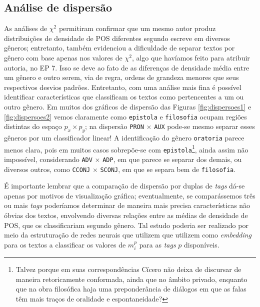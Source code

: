 \documentclass[10pt,a4paper,onecolumn]{article}
\theoremstyle{definition}
\theoremstyle{remark}
\begin{document}
\subsection{Análise de dispersão}\label{sec:dispersao}
As análises de $\chi^2$ permitiram confirmar que um mesmo autor produz distribuições de densidade de POS diferentes segundo escreve em diversos gêneros; entretanto, também evidenciou a dificuldade de separar textos por gênero com base apenas nos valores de $\chi^2$, algo que havíamos feito para atribuir autoria, no EP 7. Isso se deve ao fato de as diferenças de densidade média entre um gênero e outro serem, via de regra, ordens de grandeza menores que seus respectivos desvios padrões. Entretanto, com uma análise mais fina é possível identificar características que classificam os textos como pertencentes a um ou outro gênero. Em muitos dos gráficos de dispersão das Figuras \ref{fig:dispersoes1} e \ref{fig:dispersoes2} vemos claramente como \texttt{epistola} e \texttt{filosofia} ocupam regiões distintas do espaço $p_x \times p_y$; na dispersão \texttt{PRON} $\times$ \texttt{AUX} pode-se mesmo separar esses gêneros por um classificador linear! A identificação do gênero \texttt{oratoria} parece menos clara, pois em muitos casos sobrepõe-se com \texttt{epistola}\footnote{Talvez porque em suas correspondências Cícero não deixa de discursar de maneira retoricamente conformada, ainda que no âmbito privado, enquanto que na obra filosófica haja uma preponderância de diálogos em que as falas têm mais traços de oralidade e espontaneidade?}, ainda assim não impossível, considerando \texttt{ADV} $\times$ \texttt{ADP}, em que parece se separar dos demais, ou diversos outros, como \texttt{CCONJ} $\times$ \texttt{SCONJ}, em que se separa bem de \texttt{filosofia}.

É importante lembrar que a comparação de dispersão por duplas de \emph{tags} dá-se apenas por motivos de visualização gráfica; eventualmente, se comparássemos três ou mais \emph{tags} poderíamos determinar de maneira mais precisa características não óbvias dos textos, envolvendo diversas relações entre as médias de densidade de POS, que os classificariam segundo gênero. Tal estudo poderia ser realizado por meio da estruturação de redes neurais que utilizem que utilizem como \emph{embedding} para os textos a classificar os valores de $m_i^p$ para as \emph{tags} $p$ disponíveis. 
\end{document}
